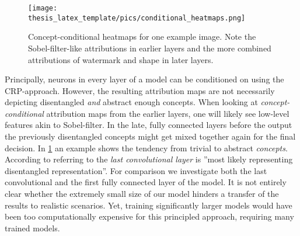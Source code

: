 \begin{figure}[t!]
    \centering
    \texttt{[image: thesis\_latex\_template/pics/conditional\_heatmaps.png]}
    \caption[Comparing Attribution Maps of Layers]{Concept-conditional heatmaps for one example image. Note the Sobel-filter-like attributions in earlier layers and the more combined attributions of watermark and shape in later layers.}
    \label{fig:cc_heatmaps}
\end{figure}



Principally, neurons in every layer of a model can be conditioned on using the CRP-approach. However, the resulting attribution maps are not necessarily depicting disentangled \textit{and} abstract enough concepts. When looking at \textit{concept-conditional} attribution maps from the earlier layers, one will likely see low-level features akin to Sobel-filter. In the late, fully connected layers before the output the previously disentangled concepts might get mixed together again for the final decision. In \cref{fig:cc_heatmaps} an example shows the tendency from trivial to abstract \textit{concepts}. 
According to \cite{Dreyer2023a} referring to \cite{Zeiler2013} the \textit{last convolutional layer} is ''most likely representing disentangled representation''. For comparison we investigate both the last convolutional and the first fully connected layer of the model. It is not entirely clear whether the extremely small size of our model hinders a transfer of the results to realistic scenarios. Yet, training significantly larger models would have been too computationally expensive for this principled approach, requiring many trained models.\\


